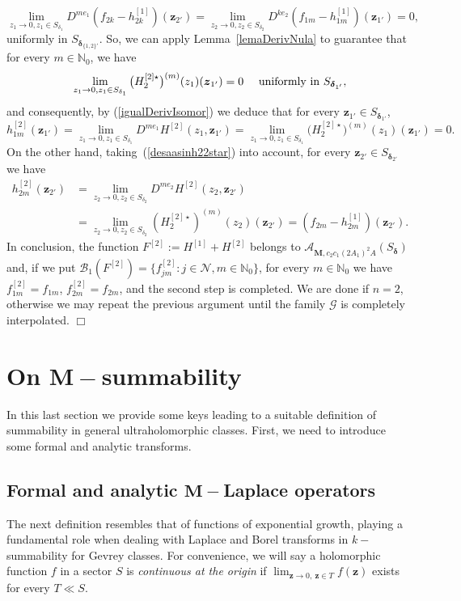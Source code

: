 \documentclass[11pt,a4paper,leqno]{article}
\theoremstyle{plain}
\theoremstyle{definition}
\newenvironment{proof1}{\medskip\par\noindent{\bf Proof}}{\hfill $\Box$
\medskip\par}
\def\N{\mathbb{N}}
\def\bdelta{\boldsymbol{\delta}}
\def\bM{\boldsymbol{M}}
\def\bz{\boldsymbol{z}}
\begin{document}
\begin{proof1}
$$
\lim_{z_{1}\to0,z_{1}\in S_{\delta_{1}}}D^{me_{1}}(f_{2k}-h^{[1]}_{2k})(\bz_{2'})=\lim_{z_{2}\to0,z_{2}\in S_{\delta_{2}}}D^{ke_{2}}(f_{1m}-h^{[1]}_{1m})(\bz_{1'})=0,$$
uniformly in $S_{\bdelta_{\{1,2\}'}}$. So, we can apply Lemma~\ref{lemaDerivNula} to guarantee that for every $m\in\N_{0}$,
we have
$$\lim_{z_{1}\to0,z_{1}\in S_{\delta_{1}}}\big(H_2^{[2]\star}\big)^{(m)}(z_1)(\bz_{1'})=0\quad\hbox{ uniformly in } S_{\bdelta_{1'}},$$
and consequently, by (\ref{igualDerivIsomor}) we deduce that for every $\bz_{1'}\in S_{\bdelta_{1'}}$,
$$
h_{1m}^{[2]}(\bz_{1'})=\lim_{z_{1}\to0,z_{1}\in S_{\delta_{1}}}D^{me_{1}}H^{[2]}(z_1,\bz_{1'})=\lim_{z_{1}\to0,z_{1}\in S_{\delta_{1}}}\big(H_2^{[2]\star}\big)^{(m)}(z_1)(\bz_{1'})=0.
$$
On the other hand, taking~(\ref{desaasinh22star}) into account, for every $\bz_{2'}\in S_{\bdelta_{2'}}$ we have
\begin{align*}
h_{2m}^{[2]}(\bz_{2'})&=\lim_{z_{2}\to0,z_{2}\in S_{\delta_{2}}}D^{me_{2}}H^{[2]}(z_2,\bz_{2'})\\
&=
\lim_{z_{2}\to0,z_{2}\in S_{\delta_{2}}}(H_{2}^{[2]\star})^{(m)}(z_{2})(\bz_{2'})=(f_{2m}-h_{2m}^{[1]})(\bz_{2'}).
\end{align*}
In conclusion, the function $F^{[2]}:=H^{[1]}+H^{[2]}$ belongs to $\mathcal{A}_{\bM,c_{2}c_{1}(2A_{1})^{2}A}(S_{\bdelta})$ and,
if we put $\mathcal{B}_{1}(F^{[2]})=\{f_{jm}^{[2]}:j\in \mathcal{N},m\in\N_{0}\}$, for every $m\in\N_{0}$ we have $f_{1m}^{[2]}=f_{1m}$, $f_{2m}^{[2]}=f_{2m}$,
and the second step is completed. We are done if $n=2$, otherwise we may repeat the previous argument until the family $\mathcal{G}$ is completely interpolated.
\end{proof1}

\section{On $\bM-$summability}

In this last section we provide some keys leading to a suitable definition of summability in general ultraholomorphic classes. First, we need to introduce some formal and analytic transforms.

\subsection{Formal and analytic $\bM-$Laplace operators}


The next definition resembles that of functions of exponential growth, playing a fundamental role when dealing with Laplace and Borel transforms in $k-$summability for Gevrey classes.
For convenience, we will say a holomorphic function $f$ in a sector $S$ is {\it continuous at the origin} if $\lim_{\bz\to 0,\ \bz\in T}f(\bz)$ exists for every $T\ll S$.
\end{document}
